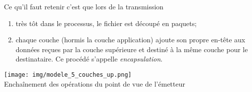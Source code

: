 \documentclass[a4paper,12pt]{book}
\begin{document}
Ce qu'il faut retenir c'est que lors de la transmission
\begin{enumerate}[--]
	\item 	très tôt dans le processus, le fichier est découpé en paquets;
	\item 	chaque couche (hormis la couche application) ajoute son propre en-tête aux données reçues par la couche supérieure et destiné à la même couche pour le destinataire. Ce procédé s'appelle \textit{encapsulation}.
\end{enumerate}

\begin{center}
\texttt{[image: img/modele\_5\_couches\_up.png]}\\

\footnotesize{Enchaînement des opérations du point de vue de l'émetteur}
\end{center}
\end{document}
